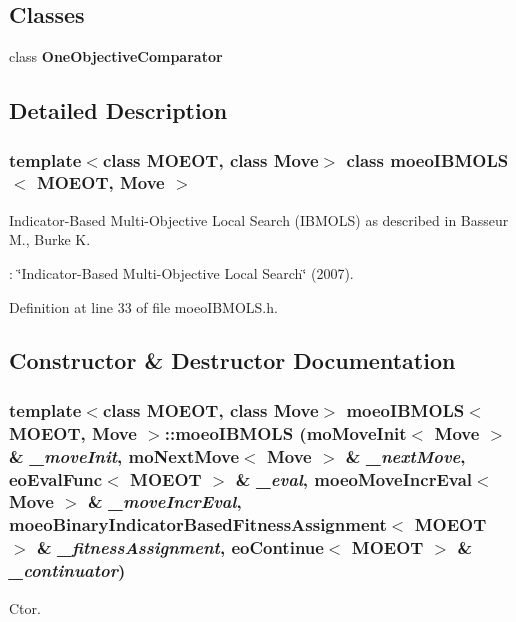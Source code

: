 \subsection*{Classes}
\begin{CompactItemize}
\item 
class \bf{One\-Objective\-Comparator}
\end{CompactItemize}


\subsection{Detailed Description}
\subsubsection*{template$<$class MOEOT, class Move$>$ class moeo\-IBMOLS$<$ MOEOT, Move $>$}

Indicator-Based Multi-Objective Local Search (IBMOLS) as described in Basseur M., Burke K. 

: \char`\"{}Indicator-Based Multi-Objective Local Search\char`\"{} (2007). 



Definition at line 33 of file moeo\-IBMOLS.h.

\subsection{Constructor \& Destructor Documentation}
\subsubsection{\setlength{\rightskip}{0pt plus 5cm}template$<$class MOEOT, class Move$>$ \bf{moeo\-IBMOLS}$<$ MOEOT, Move $>$::\bf{moeo\-IBMOLS} (mo\-Move\-Init$<$ Move $>$ \& {\em \_\-move\-Init}, mo\-Next\-Move$<$ Move $>$ \& {\em \_\-next\-Move}, \bf{eo\-Eval\-Func}$<$ MOEOT $>$ \& {\em \_\-eval}, \bf{moeo\-Move\-Incr\-Eval}$<$ Move $>$ \& {\em \_\-move\-Incr\-Eval}, \bf{moeo\-Binary\-Indicator\-Based\-Fitness\-Assignment}$<$ MOEOT $>$ \& {\em \_\-fitness\-Assignment}, \bf{eo\-Continue}$<$ MOEOT $>$ \& {\em \_\-continuator})\hspace{0.3cm}{\tt  [inline]}}\label{classmoeoIBMOLS_6d6a39ad3d5e4c298d450d801098e274}


Ctor. 

